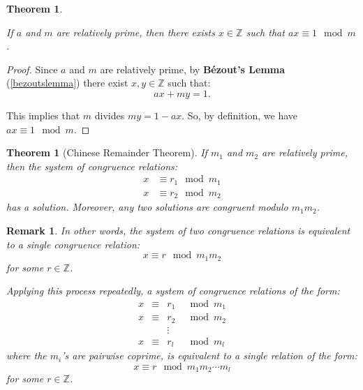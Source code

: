 \documentclass[a4paper,12pt]{report}
\newcounter{statement}
\numberwithin{statement}{chapter}
\newtheorem{thm}[statement]{Theorem}
\newtheorem*{remark}{\bf Remark}
\numberwithin{equation}{chapter}
\numberwithin{section}{chapter}
\numberwithin{subsection}{section}
\begin{document}
\begin{thm}
\label{thm:inversemodm}


If $a$ and $m$ are relatively prime, then there exists $x \in \mathbb{Z}$ such that
$ax \equiv 1 \mod m$.
\end{thm}
\begin{proof}

Since $a$ and $m$ are relatively prime, by  {\bf Bézout's Lemma} 
(\cref{bezoutslemma})
there exist $x, y \in \mathbb{Z}$ such that:
\[
ax + my = 1.
\]

This implies that $m$ divides $my = 1 - ax$. So, by definition,
we have $ax \equiv 1 \mod m$.

\end{proof}

\begin{thm}[Chinese Remainder Theorem]


If $m_1$ and $m_2$ are relatively prime, then the system of congruence relations:
\begin{equation*}
\begin{split}
x &\equiv r_1 \mod m_1\\
x &\equiv r_2 \mod m_2
\end{split}
\end{equation*}
has a solution. Moreover, any two solutions are congruent modulo $m_1m_2$.
\end{thm}
\begin{remark}

In other words, the system of two congruence relations is equivalent to
a single congruence relation:
\[
x \equiv r \mod m_1 m_2
\]
for some $r \in \mathbb{Z}$.




Applying this process repeatedly, a system of congruence relations of the form:
\begin{align*}
x &\equiv& r_1 &\mod m_1 \\
x &\equiv& r_2 &\mod m_2 \\
& &  \vdots &\\
x &\equiv&  r_l &\mod m_l
\end{align*}
where the $m_i$'s are pairwise coprime, is equivalent to a single relation of the
form:
\[
x \equiv r \mod m_1m_2\cdots m_l
\]
for some $r \in \mathbb{Z}$.
\end{remark}
\end{document}
